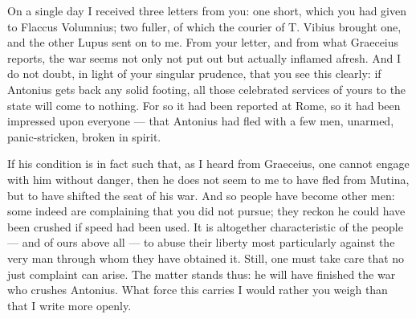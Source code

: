 

 On a single day I received three letters from you: one short, which you had given to Flaccus Volumnius; two fuller, of which the courier of T. Vibius brought one, and the other Lupus sent on to me. From your letter, and from what Graeceius reports, the war seems not only not put out but actually inflamed afresh. And I do not doubt, in light of your singular prudence, that you see this clearly: if Antonius gets back any solid footing, all those celebrated services of yours to the state will come to nothing. For so it had been reported at Rome, so it had been impressed upon everyone --- that Antonius had fled with a few men, unarmed, panic-stricken, broken in spirit.

 If his condition is in fact such that, as I heard from Graeceius, one cannot engage with him without danger, then he does not seem to me to have fled from Mutina, but to have shifted the seat of his war. And so people have become other men: some indeed are complaining that you did not pursue; they reckon he could have been crushed if speed had been used. It is altogether characteristic of the people --- and of ours above all --- to abuse their liberty most particularly against the very man through whom they have obtained it. Still, one must take care that no just complaint can arise. The matter stands thus: he will have finished the war who crushes Antonius. What force this carries I would rather you weigh than that I write more openly.

